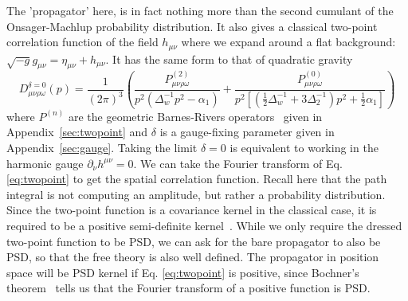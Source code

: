 \documentclass[aps,preprintnumbers,superscriptaddress,longbibliography]{revtex4-1}
\begin{document}
The 'propagator' here, is in fact nothing more than the second cumulant of the Onsager-Machlup probability distribution. It also gives  a classical two-point correlation function of the field $h_{\mu \nu}$ where we expand around a flat background: $\sqrt{-g}g_{\mu \nu}=\eta_{\mu \nu}+h_{\mu \nu}$. It has the same form to that of quadratic gravity~\cite{stelle1978classical}  
\begin{equation}
    D^{\delta=0}_{\mu \nu \rho \omega}(p)=
    \frac{1}{(2\pi)^3}\left(\frac{P^{(2)}_{\mu \nu \rho \omega}}{p^2(\Delta_w^{-1} p^2-\alpha_1)}+\frac{P^{(0)}_{\mu \nu \rho \omega}}{p^2[(\frac{1}{2}\Delta_w^{-1}+3\Delta_2^{-1})p^2+\frac{1}{2}\alpha_1]}\right)
%    
    \label{eq:twopoint}
\end{equation}
%
%
%
where %
$P^{(n)}$ are the geometric Barnes-Rivers operators~\cite{barnes1963thesis,rivers1964lagrangian,van1973ghost} given in Appendix~\ref{sec:twopoint}
and $\delta$ is a gauge-fixing parameter given in Appendix~\ref{sec:gauge}. Taking the limit $\delta=0$ is equivalent to working in the harmonic gauge $\partial_\nu h^{\mu\nu}=0$. 
We can take the Fourier transform of Eq. \eqref{eq:twopoint} to get the spatial correlation function.  Recall here that the path integral is not computing an amplitude, but rather a probability distribution. Since the two-point function is a covariance kernel in the classical case, it is required to be a positive semi-definite kernel~\cite{risken1996fokker,gardiner2004handbook}. While we only require the dressed two-point function to be PSD, we can ask for the bare propagator to also be PSD, so that the free theory is also well defined. The propagator in position space will be PSD kernel if Eq. \eqref{eq:twopoint} is positive, since Bochner's theorem~\cite{bochner1933monotone} tells us that the Fourier transform of a positive function is PSD. %
\end{document}
